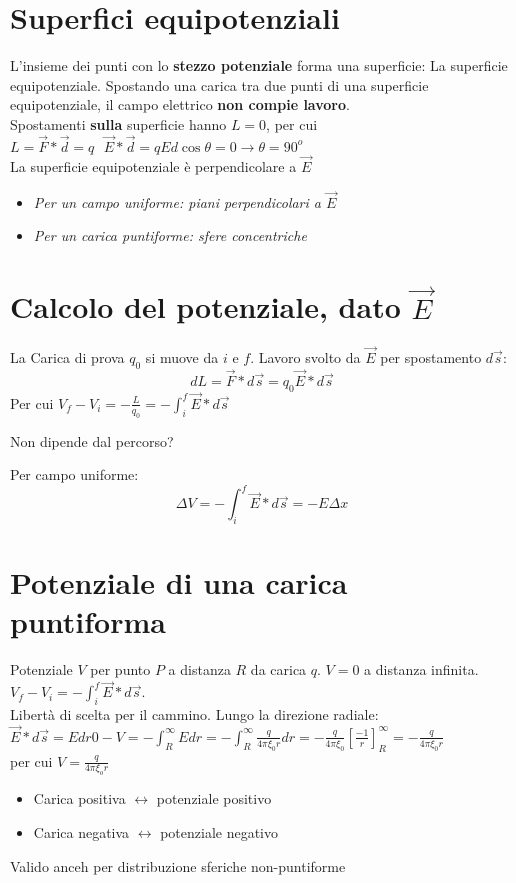 \documentclass{book}
\begin{document}
\section{Superfici equipotenziali}
L'insieme dei punti con lo \textbf{stezzo potenziale} forma una superficie: La superficie equipotenziale. Spostando una carica tra due punti di una superficie equipotenziale, il campo elettrico \textbf{non compie lavoro}.\\
Spostamenti \textbf{sulla} superficie hanno $L=0$, per cui $L=\vec{F}*\vec{d}=q \text{ } \vec{E}*\vec{d}=qEd\cos\theta=0\to \theta =90^o$\\
La superficie equipotenziale è perpendicolare a $\vec{E}$
\begin{itemize}
\item \textit{Per un campo uniforme: piani perpendicolari a $\vec{E}$}
\item \textit{Per un carica puntiforme: sfere concentriche}
\end{itemize}
\section {Calcolo del potenziale, dato $\vec{E}$}
La Carica di prova $q_0$ si muove da $i$ e $f$. Lavoro svolto da $\vec{E}$ per spostamento $d\vec{s}$:
\begin{equation}
	dL=\vec{F}*d\vec{s}=q_0\vec{E}*d\vec{s}
\end{equation}
Per cui $V_f-V_i=-\frac{L}{q_0}=-\int^f_i \vec{E}*d\vec{s}$
\begin{center}
	Non dipende dal percorso?
\end{center}
Per campo uniforme:
\begin{equation}
  \Delta V=-\int_i^f \vec{E}*d\vec{s}=-E\Delta x
\end{equation}
\section{Potenziale di una carica puntiforma}
Potenziale $V$ per punto $P$ a distanza $R$ da carica $q$. $V=0$ a distanza infinita. $V_f-V_i=-\int^f_i\vec{E}*d\vec{s}$.\\
Libertà di scelta per il cammino. Lungo la direzione radiale: $\vec{E}*d\vec{s}=Edr0-V=-\int^\infty_REdr=-\int^\infty_R\frac{q}{4\pi \xi_0r}dr=-\frac{q}{4\pi \xi_0}\left[\frac{-1}{r}\right]^\infty_R=-\frac{q}{4\pi \xi_0 r}$\\
per cui $V=\frac{q}{4\pi\xi_or}$
\begin{itemize}
\item Carica positiva $\leftrightarrow$ potenziale positivo
\item Carica negativa $\leftrightarrow$ potenziale negativo
\end{itemize}
Valido anceh per distribuzione sferiche non-puntiforme
\end{document}

